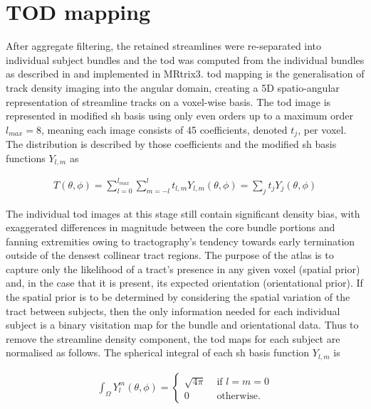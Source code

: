 \section{TOD mapping}

After aggregate filtering, the retained streamlines were re-separated into individual subject bundles and the \gls{tod} was computed from the individual bundles as described in \textcite{Dhollander2014} and implemented in MRtrix3. \autocite{Tournier2019}
\gls{tod} mapping is the generalisation of track density imaging into the angular domain, creating a 5D spatio-angular representation of streamline tracks on a voxel-wise basis.
The \gls{tod} image is represented in modified \gls{sh} basis \autocite{Descoteaux2006} using only even orders up to a maximum order $l_{max}=8$, meaning each image consists of 45 coefficients, denoted $t_j$, per voxel.
The distribution is described by those coefficients and the modified \gls{sh} basis functions $Y_{l,m}$ \autocite{Descoteaux2006} as

\begin{align}
  T(\theta, \phi) = \sum_{l=0}^{l_{max}} \sum_{m=-l}^l t_{l,m} Y_{l,m}(\theta, \phi) = \sum_j t_jY_j(\theta, \phi)
\end{align}

The individual \gls{tod} images at this stage still contain significant density bias, with exaggerated differences in magnitude between the core bundle portions and fanning extremities owing to tractography's tendency towards early termination outside of the densest collinear tract regions.\autocite{Rheault2020,Smith2013}
The purpose of the atlas is to capture only the likelihood of a tract's presence in any given voxel (spatial prior) and, in the case that it is present, its expected orientation (orientational prior).
If the spatial prior is to be determined by considering the spatial variation of the tract between subjects, then the only information needed for each individual subject is a binary visitation map for the bundle and orientational data.
Thus to remove the streamline density component, the \gls{tod} maps for each subject are normalised as follows.
The spherical integral of each \gls{sh} basis function $Y_{l,m}$ is

\begin{align}
  \int_{\Omega} Y^m_l(\theta, \phi) = \begin{cases}
   \sqrt{4\pi} & \text{ if } l=m=0\\
   0 & \text{ otherwise. }
  \end{cases}
\end{align}


